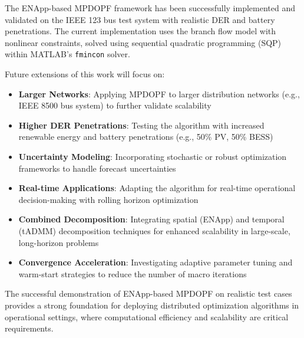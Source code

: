 The ENApp-based MPDOPF framework has been successfully implemented and validated on the IEEE 123 bus test system with realistic DER and battery penetrations. The current implementation uses the branch flow model with nonlinear constraints, solved using sequential quadratic programming (SQP) within MATLAB's \texttt{fmincon} solver.

Future extensions of this work will focus on:

\begin{itemize}
    \item \textbf{Larger Networks}: Applying MPDOPF to larger distribution networks (e.g., IEEE 8500 bus system) to further validate scalability
    \item \textbf{Higher DER Penetrations}: Testing the algorithm with increased renewable energy and battery penetrations (e.g., 50\% PV, 50\% BESS)
    \item \textbf{Uncertainty Modeling}: Incorporating stochastic or robust optimization frameworks to handle forecast uncertainties
    \item \textbf{Real-time Applications}: Adapting the algorithm for real-time operational decision-making with rolling horizon optimization
    \item \textbf{Combined Decomposition}: Integrating spatial (ENApp) and temporal (tADMM) decomposition techniques for enhanced scalability in large-scale, long-horizon problems
    \item \textbf{Convergence Acceleration}: Investigating adaptive parameter tuning and warm-start strategies to reduce the number of macro iterations
\end{itemize}

The successful demonstration of ENApp-based MPDOPF on realistic test cases provides a strong foundation for deploying distributed optimization algorithms in operational settings, where computational efficiency and scalability are critical requirements.
